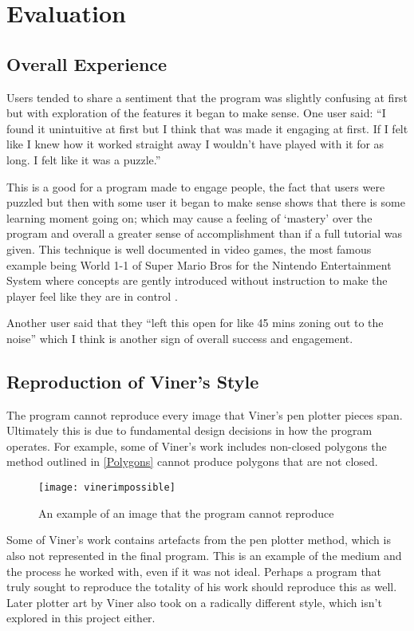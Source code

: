 \section{Evaluation}
\subsection{Overall Experience}
Users tended to share a sentiment that the program was slightly confusing at
first but with exploration of the features it began to make sense. One user
said: ``I found it unintuitive at first but I think that was made it engaging at
first. If I felt like I knew how it worked straight away I wouldn't have played
with it for as long. I felt like it was a puzzle.''

This is a good for a program made to engage people, the fact that users were
puzzled but then with some user it began to make sense shows that there is some
learning moment going on; which may cause a feeling of `mastery' over the
program and overall a greater sense of accomplishment than if a full tutorial
was given. This technique is well documented in video games, the most famous
example being World 1-1 of Super Mario Bros for the Nintendo Entertainment
System where concepts are gently introduced without instruction to make the
player feel like they are in control \citep{miyamoto11}.

Another user said that they ``left this open for like 45 mins zoning out to the
noise'' which I think is another sign of overall success and engagement.

\subsection{Reproduction of Viner's Style}
The program cannot reproduce every image that Viner's pen plotter pieces span.
Ultimately this is due to fundamental design decisions in how the program
operates. For example, some of Viner's work includes non-closed polygons the
method outlined in \autoref{Polygons} cannot produce polygons that are not
closed. 

\begin{figure}[H]
    \centering
    \texttt{[image: vinerimpossible]}
    \caption{An example of an image that the program cannot reproduce}
\end{figure}

Some of Viner's work contains artefacts from the pen plotter method, which is
also not represented in the final program. This is an example of the medium and
the process he worked with, even if it was not ideal. Perhaps a program that
truly sought to reproduce the totality of his work should reproduce this as
well. Later plotter art by Viner also took on a radically different style, which
isn't explored in this project either.

